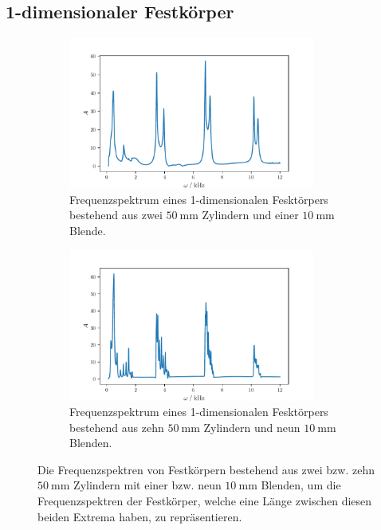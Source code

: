 \subsection{1-dimensionaler Festkörper}
\begin{figure}
    \begin{subfigure}{0.48\textwidth}%
    \centering%
    \includegraphics[height=5cm]{build/2c1b10.pdf}%
    \caption{Frequenzspektrum eines 1-dimensionalen Fesktörpers bestehend aus zwei $\qty{50}{\milli\meter}$ Zylindern und einer $\qty{10}{\milli\meter}$ Blende.}%
    \label{fig:2c1b10}%
    \end{subfigure}%
    \hfill%
    \begin{subfigure}{0.48\textwidth}%
    \centering%
    \includegraphics[height=5cm]{build/10c9b10.pdf}%
    \caption{Frequenzspektrum eines 1-dimensionalen Fesktörpers bestehend aus zehn $\qty{50}{\milli\meter}$ Zylindern und neun $\qty{10}{\milli\meter}$ Blenden.}%
    \label{fig:2c1b}%
    \end{subfigure}%
    \caption{Die Frequenzspektren von Festkörpern bestehend aus zwei bzw. zehn $\qty{50}{\milli\meter}$ Zylindern mit einer bzw. neun $\qty{10}{\milli\meter}$ Blenden, um die 
    Frequenzspektren der Festkörper, welche eine Länge zwischen diesen beiden Extrema haben, zu repräsentieren.}%
    \label{fig:10mm}
\end{figure}%
